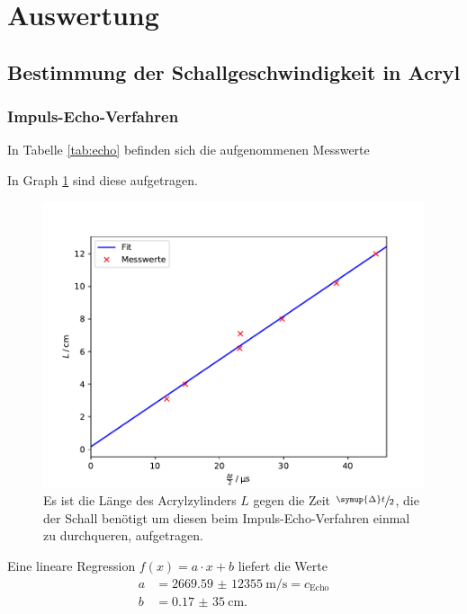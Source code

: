 \section{Auswertung}

\subsection{Bestimmung der Schallgeschwindigkeit in Acryl \label{sec:schall}}

\subsubsection{Impuls-Echo-Verfahren}

In Tabelle \ref{tab:echo} befinden sich die aufgenommenen Messwerte


In Graph \ref{fig:echo} sind diese aufgetragen.
\begin{figure}[H]
  \centering
  \includegraphics[width=\textwidth]{Plots/echo.pdf}
  \caption{Es ist die Länge des Acrylzylinders $L$ gegen die Zeit $\sfrac{\symup{\Delta}t}{2}$, die der Schall benötigt um diesen beim Impuls-Echo-Verfahren einmal zu durchqueren, aufgetragen.}
  \label{fig:echo}
\end{figure}

Eine lineare Regression $f(x) = a \cdot x + b$ liefert die Werte
\begin{align*}
  a &= \SI{2669,59(12355)}{\m \per \s} = c_\text{Echo} \\
  b &= \SI{0,17(35)}{\cm}.
\end{align*}

